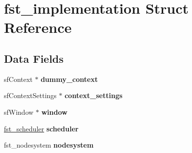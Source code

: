 \hypertarget{structfst__implementation}{\section{fst\-\_\-implementation Struct Reference}
\label{structfst__implementation}
}
\subsection*{Data Fields}
\begin{DoxyCompactItemize}
\item 
\hypertarget{structfst__implementation_ad4da93c7e29a8c1ed6179dbee3b47f5f}{sf\-Context $\ast$ {\bfseries dummy\-\_\-context}}\label{structfst__implementation_ad4da93c7e29a8c1ed6179dbee3b47f5f}

\item 
\hypertarget{structfst__implementation_a2a067b83ea76571943500a454ddb170a}{sf\-Context\-Settings $\ast$ {\bfseries context\-\_\-settings}}\label{structfst__implementation_a2a067b83ea76571943500a454ddb170a}

\item 
\hypertarget{structfst__implementation_a0bdd3e90cfd4d7b19366c03fa37d34a4}{sf\-Window $\ast$ {\bfseries window}}\label{structfst__implementation_a0bdd3e90cfd4d7b19366c03fa37d34a4}

\item 
\hypertarget{structfst__implementation_a88a18917674c0933358fbca6b993c899}{\hyperlink{structfst__scheduler}{fst\-\_\-scheduler} {\bfseries scheduler}}\label{structfst__implementation_a88a18917674c0933358fbca6b993c899}

\item 
\hypertarget{structfst__implementation_a8efbeacbace3596749b8a71b0502aa37}{fst\-\_\-nodesystem {\bfseries nodesystem}}\label{structfst__implementation_a8efbeacbace3596749b8a71b0502aa37}

\end{DoxyCompactItemize}


